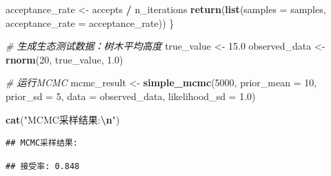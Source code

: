 \documentclass[
]{book}
\newenvironment{Shaded}{\begin{snugshade}}{\end{snugshade}}
\newcommand{\AttributeTok}[1]{\textcolor[rgb]{0.13,0.29,0.53}{#1}}
\newcommand{\CommentTok}[1]{\textcolor[rgb]{0.56,0.35,0.01}{\textit{#1}}}
\newcommand{\DecValTok}[1]{\textcolor[rgb]{0.00,0.00,0.81}{#1}}
\newcommand{\FloatTok}[1]{\textcolor[rgb]{0.00,0.00,0.81}{#1}}
\newcommand{\FunctionTok}[1]{\textcolor[rgb]{0.13,0.29,0.53}{\textbf{#1}}}
\newcommand{\NormalTok}[1]{#1}
\newcommand{\OtherTok}[1]{\textcolor[rgb]{0.56,0.35,0.01}{#1}}
\newcommand{\SpecialCharTok}[1]{\textcolor[rgb]{0.81,0.36,0.00}{\textbf{#1}}}
\newcommand{\StringTok}[1]{\textcolor[rgb]{0.31,0.60,0.02}{#1}}
\begin{document}
\begin{Shaded}
\begin{Highlighting}[]
\NormalTok{  acceptance\_rate }\OtherTok{\textless{}{-}}\NormalTok{ accepts }\SpecialCharTok{/}\NormalTok{ n\_iterations}
  \FunctionTok{return}\NormalTok{(}\FunctionTok{list}\NormalTok{(}\AttributeTok{samples =}\NormalTok{ samples, }\AttributeTok{acceptance\_rate =}\NormalTok{ acceptance\_rate))}
\NormalTok{\}}

\CommentTok{\# 生成生态测试数据：树木平均高度}
\NormalTok{true\_value }\OtherTok{\textless{}{-}} \FloatTok{15.0}
\NormalTok{observed\_data }\OtherTok{\textless{}{-}} \FunctionTok{rnorm}\NormalTok{(}\DecValTok{20}\NormalTok{, true\_value, }\FloatTok{1.0}\NormalTok{)}

\CommentTok{\# 运行MCMC}
\NormalTok{mcmc\_result }\OtherTok{\textless{}{-}} \FunctionTok{simple\_mcmc}\NormalTok{(}\DecValTok{5000}\NormalTok{, }\AttributeTok{prior\_mean =} \DecValTok{10}\NormalTok{, }\AttributeTok{prior\_sd =} \DecValTok{5}\NormalTok{,}
                           \AttributeTok{data =}\NormalTok{ observed\_data, }\AttributeTok{likelihood\_sd =} \FloatTok{1.0}\NormalTok{)}

\FunctionTok{cat}\NormalTok{(}\StringTok{"MCMC采样结果:}\SpecialCharTok{\textbackslash{}n}\StringTok{"}\NormalTok{)}
\end{Highlighting}
\end{Shaded}

\begin{verbatim}
## MCMC采样结果:
\end{verbatim}

\begin{Shaded}
\end{Shaded}

\begin{verbatim}
## 接受率: 0.848
\end{verbatim}

\begin{Shaded}
\end{Shaded}
\end{document}
